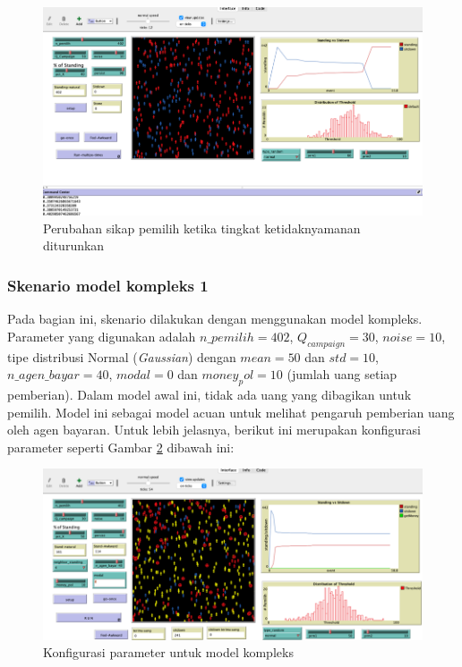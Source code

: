 \begin{figure}[H]
\centering
\includegraphics[width=\linewidth]{images/ch03/pemilusop6}
\caption{Perubahan sikap pemilih ketika tingkat ketidaknyamanan diturunkan}
\label{fig:pemilusop6}
\end{figure}

\subsubsection{Skenario model kompleks 1}

Pada bagian ini, skenario dilakukan dengan menggunakan model kompleks. Parameter yang digunakan adalah $n\_pemilih=402$, $Q_{campaign}=30$, $noise=10$, tipe distribusi Normal (\textit{Gaussian}) dengan $mean=50$ dan $std=10$, $n\_agen\_bayar=40$, $modal=0$ dan $money_pol=10$ (jumlah uang setiap pemberian). Dalam model awal ini, tidak ada uang yang dibagikan untuk pemilih. Model ini sebagai model acuan untuk melihat pengaruh pemberian uang oleh agen bayaran. Untuk lebih jelasnya, berikut ini merupakan konfigurasi parameter seperti Gambar \ref{fig:pemilusop7} dibawah ini:

\begin{figure}[H]
\centering
\includegraphics[width=\linewidth]{images/ch03/pemilusop7}
\caption{Konfigurasi parameter untuk model kompleks}
\label{fig:pemilusop7}
\end{figure}

